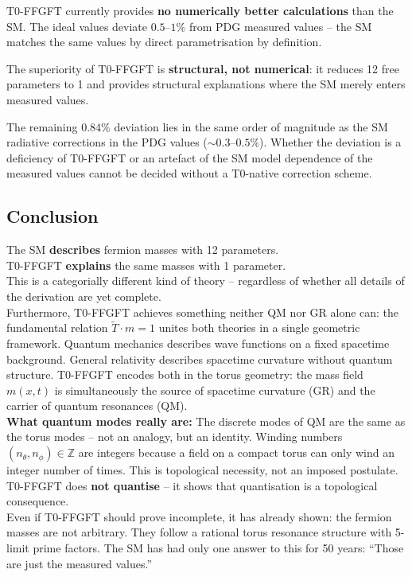 \begin{warnbox}
T0-FFGFT currently provides \textbf{no numerically better calculations}
than the SM. The ideal values deviate $0.5$--$1\%$ from PDG measured
values -- the SM matches the same values by direct parametrisation
by definition.

The superiority of T0-FFGFT is \textbf{structural, not numerical}:
it reduces 12 free parameters to 1 and provides structural explanations
where the SM merely enters measured values.
\end{warnbox}

The remaining $0.84\%$ deviation lies in the same order of magnitude
as the SM radiative corrections in the PDG values ($\sim 0.3$--$0.5\%$).
Whether the deviation is a deficiency of T0-FFGFT or an artefact of
the SM model dependence of the measured values cannot be decided
without a T0-native correction scheme.

\subsection{Conclusion}

\begin{predbox}
The SM \textbf{describes} fermion masses with 12 parameters.\\
T0-FFGFT \textbf{explains} the same masses with 1 parameter.\\[4pt]
This is a categorially different kind of theory -- regardless of
whether all details of the derivation are yet complete.\\[4pt]
Furthermore, T0-FFGFT achieves something neither QM nor GR alone
can: the fundamental relation $\tilde{T} \cdot m = 1$ unites both
theories in a single geometric framework.
Quantum mechanics describes wave functions on a fixed spacetime
background. General relativity describes spacetime curvature without
quantum structure. T0-FFGFT encodes both in the torus geometry:
the mass field $m(x,t)$ is simultaneously the source of spacetime
curvature (GR) and the carrier of quantum resonances (QM).\\[4pt]
\textbf{What quantum modes really are:}
The discrete modes of QM are the same as the torus modes --
not an analogy, but an identity. Winding numbers
$(n_\theta, n_\phi) \in \mathbb{Z}$ are integers because a field
on a compact torus can only wind an integer number of times.
This is topological necessity, not an imposed postulate.
T0-FFGFT does \textbf{not quantise} -- it shows that quantisation
is a topological consequence.\\[4pt]
Even if T0-FFGFT should prove incomplete, it has already shown:
the fermion masses are not arbitrary. They follow a rational
torus resonance structure with 5-limit prime factors. The SM
has had only one answer to this for 50 years:
``Those are just the measured values.''
\end{predbox}

